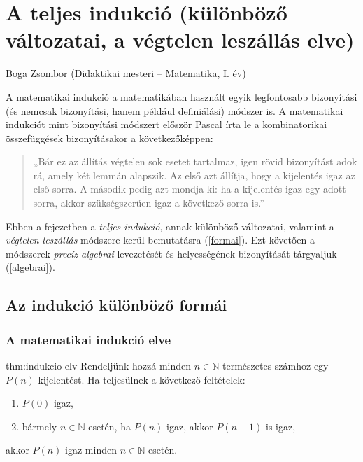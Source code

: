 
\chapter{A teljes indukció (különböző változatai, a végtelen leszállás elve)}\label{chap:indukcio}
\begin{description}
{\large \item [{Szerző:}] Boga Zsombor (Didaktikai mesteri -- Matematika, I. év)}
\end{description}
A matematikai indukció a matematikában használt egyik legfontosabb
bizonyítási (és nemcsak bizonyítási, hanem például definiálási) módszer
is. A matematikai indukciót mint bizonyítási módszert először Pascal
írta le a kombinatorikai összefüggések bizonyításakor a következőképpen: 
\begin{quote}
„Bár ez az állítás végtelen sok esetet tartalmaz, igen rövid bizonyítást
adok rá, amely két lemmán alapszik. Az első azt állítja, hogy a kijelentés
igaz az első sorra. A második pedig azt mondja ki: ha a kijelentés
igaz egy adott sorra, akkor szükségszerűen igaz a következő sorra
is.” 
\end{quote}
Ebben a fejezetben a \emph{teljes indukció}, annak különböző változatai,
valamint a \emph{végtelen leszállás} módszere kerül bemutatásra (\ref{formai}).
Ezt követően a módszerek \emph{precíz algebrai} levezetését és helyességének
bizonyítását tárgyaljuk (\ref{algebrai}).

\section*{Az indukció különböző formái}

\label{formai}


\subsection*{A matematikai indukció elve }
\begin{theorem}{thm:indukcio-elv} Rendeljünk hozzá minden $n\in\mathbb{N}$
természetes számhoz egy $P(n)$ kijelentést. Ha teljesülnek a következő
feltételek: 
\begin{enumerate}
\item $P(0)$ igaz, 
\item bármely $n\in\mathbb{N}$ esetén, ha $P(n)$ igaz, akkor $P(n+1)$
is igaz, 
\end{enumerate}
akkor $P(n)$ igaz minden $n\in\mathbb{N}$ esetén. 
\end{theorem}


